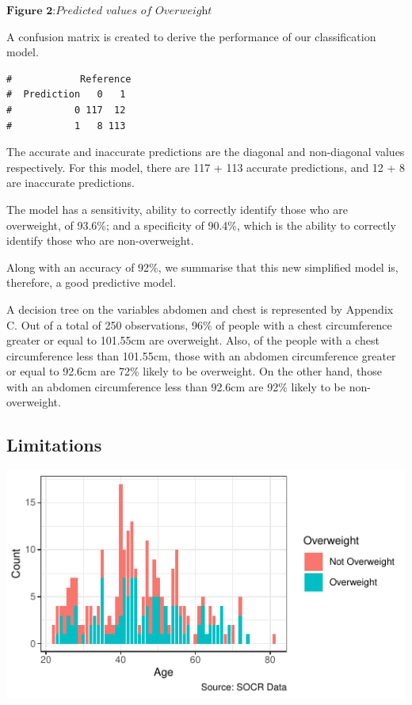\documentclass[a4paper,9pt,twocolumn,twoside,]{pinp}
\begin{document}
\(\textbf{Figure 2:}\textit{Predicted values of Overweight}\)

A confusion matrix is created to derive the performance of our
classification model.

\begin{ShadedResult}
\begin{verbatim}
#            Reference
#  Prediction   0   1
#           0 117  12
#           1   8 113
\end{verbatim}
\end{ShadedResult}

The accurate and inaccurate predictions are the diagonal and
non-diagonal values respectively. For this model, there are 117 + 113
accurate predictions, and 12 + 8 are inaccurate predictions.

The model has a sensitivity, ability to correctly identify those who are
overweight, of 93.6\%; and a specificity of 90.4\%, which is the ability
to correctly identify those who are non-overweight.

Along with an accuracy of 92\%, we summarise that this new simplified
model is, therefore, a good predictive model.

A decision tree on the variables abdomen and chest is represented by
Appendix C. Out of a total of 250 observations, 96\% of people with a
chest circumference greater or equal to 101.55cm are overweight. Also,
of the people with a chest circumference less than 101.55cm, those with
an abdomen circumference greater or equal to 92.6cm are 72\% likely to
be overweight. On the other hand, those with an abdomen circumference
less than 92.6cm are 92\% likely to be non-overweight.

\hypertarget{limitations}{%
\subsection{Limitations}\label{limitations}}

\begin{center}\includegraphics{Executive_Report_files/figure-latex/unnamed-chunk-4-1} \end{center}
\end{document}
